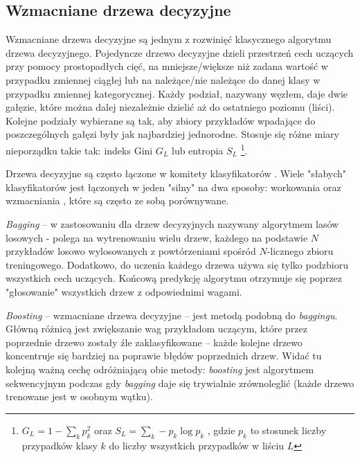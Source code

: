 \subsection{Wzmacniane drzewa decyzyjne}
\label{subsec:drzewa}

Wzmacniane drzewa decyzyjne są jednym z rozwinięć klasycznego algorytmu drzewa decyzyjnego. 
Pojedyncze drzewo decyzyjne dzieli przestrzeń cech uczących przy pomocy prostopadłych cięć, na mniejsze/większe niż zadana wartość w przypadku zmiennej ciągłej lub na należące/nie należące do danej klasy w przypadku zmiennej kategorycznej. Każdy podział, nazywany węzłem, daje dwie gałęzie, które można dalej niezależnie dzielić aż do ostatniego poziomu (liści). Kolejne podziały wybierane są tak, aby zbiory przykładów wpadające do poszczególnych gałęzi były jak najbardziej jednorodne. Stosuje się różne miary nieporządku takie tak: indeks Gini $G_L$ lub entropia $S_L$ \footnote{$G_L = 1 - \sum\limits_k p_k^2$ oraz $S_L = \sum\limits_k -p_k \log p_k$ , gdzie $p_k$ to stosunek liczby przypadków klasy $k$ do liczby wszystkich przypadków w liściu $L$}.

Drzewa decyzyjne są często łączone w komitety klasyfikatorów . Wiele "słabych" klasyfikatorów jest łączonych w jeden "silny" na dwa sposoby: workowania  \cite{breiman1996bagging} oraz wzmacniania  \cite{freund1997decision}, które są często ze sobą porównywane.

\textit{Bagging} -- w zastosowaniu dla drzew decyzyjnych nazywany algorytmem lasów losowych  - polega na wytrenowaniu wielu drzew, każdego na podstawie $N$ przykładów losowo wylosowanych z powtórzeniami spośród $N$-licznego zbioru treningowego. Dodatkowo, do uczenia każdego drzewa używa się tylko podzbioru wszystkich cech uczących. Końcową predykcję algorytmu otrzymuje się poprzez "głosowanie" wszystkich drzew z odpowiednimi wagami.

\textit{Boosting} -- wzmacniane drzewa decyzyjne  -- jest metodą podobną do \textit{baggingu}. Główną różnicą jest zwiększanie wag przykładom uczącym, które przez poprzednie drzewo zostały źle zaklasyfikowane -- każde kolejne drzewo koncentruje się bardziej na poprawie błędów poprzednich drzew. Widać tu kolejną ważną cechę odróżniającą obie metody: \textit{boosting} jest algorytmem sekwencyjnym podczas gdy \textit{bagging} daje się trywialnie zrównoleglić (każde drzewo trenowane jest w osobnym wątku).




